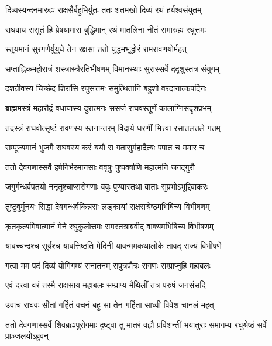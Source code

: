 \twolineshloka
{दिव्यस्यन्दनमारुह्य राक्षसैर्बहुभिर्युतः}
{ततः शतमखो दिव्यं रथं हर्यश्वसंयुतम्}%

\twolineshloka
{राघवाय ससूतं हि प्रेषयामास बुद्धिमान्}
{रथं मातलिना नीतं समारुह्य रघूत्तमः}%

\twolineshloka
{स्तूयमानं सुरगणैर्युयुधे तेन रक्षसा}
{ततो युद्धमभूद्धोरं रामरावणयोर्महत्}%

\twolineshloka
{सप्ताह्निकमहोरात्रं शस्त्रास्त्रैरतिभीषणम्}
{विमानस्थाः सुरास्सर्वे ददृशुस्तत्र संयुगम्}%

\twolineshloka
{दशग्रीवस्य चिच्छेद शिरांसि रघुसत्तमः}
{समुत्थितानि बहुशो वरदानात्कपर्दिनः}%

\twolineshloka
{ब्राह्ममस्त्रं महारौद्रं वधायास्य दुरात्मनः}
{ससर्ज राघवस्तूर्णं कालाग्निसदृशप्रभम्}%

\twolineshloka
{तदस्त्रं राघवोत्सृष्टं रावणस्य स्तनान्तरम्}
{विदार्य धरणीं भित्त्वा रसातलतले गतम्}%

\twolineshloka
{सम्पूज्यमानं भुजगै राघवस्य करं ययौ}
{स गतासुर्महादैत्यः पपात च ममार च}%

\twolineshloka
{ततो देवगणास्सर्वे हर्षनिर्भरमानसाः}
{ववृषुः पुष्पवर्षाणि महात्मनि जगद्गुरौ}%

\twolineshloka
{जगुर्गन्धर्वपतयो ननृतुश्चाप्सरोगणाः}
{ववुः पुण्यास्तथा वाताः सुप्रभोऽभूद्दिवाकरः}%

\twolineshloka
{तुष्टुवुर्मुनयः सिद्धा देवगन्धर्वकिन्नराः}
{लङ्कायां राक्षसश्रेष्ठमभिषिच्य विभीषणम्}%

\twolineshloka
{कृतकृत्यमिवात्मानं मेने रघुकुलोत्तमः}
{रामस्तत्राब्रवीद् वाक्यमभिषिच्य विभीषणम्}%


\twolineshloka
{यावच्चन्द्रश्च सूर्यश्च यावत्तिष्ठति मेदिनी}
{यावन्ममकथालोके तावद् राज्यं विभीषणे}%

\twolineshloka
{गत्वा मम पदं दिव्यं योगिगम्यं सनातनम्}
{सपुत्रपौत्रः सगणः सम्प्राप्नुहि महाबलः}%


\twolineshloka
{एवं दत्त्वा वरं तस्मै राक्षसाय महाबलः}
{सम्प्राप्य मैथिलीं तत्र परुषं जनसंसदि}%

\twolineshloka
{उवाच राघवः सीतां गर्हितं वचनं बहु}
{सा तेन गर्हिता साध्वी विवेश चानलं महत्}%


\threelineshloka
{ततो देवगणास्सर्वे शिवब्रह्मपुरोगमाः}
{दृष्ट्वा तु मातरं वह्नौ प्रविशन्तीं भयातुराः}
{समागम्य रघुश्रेष्ठं सर्वे प्राञ्जलयोऽब्रुवन्}%


